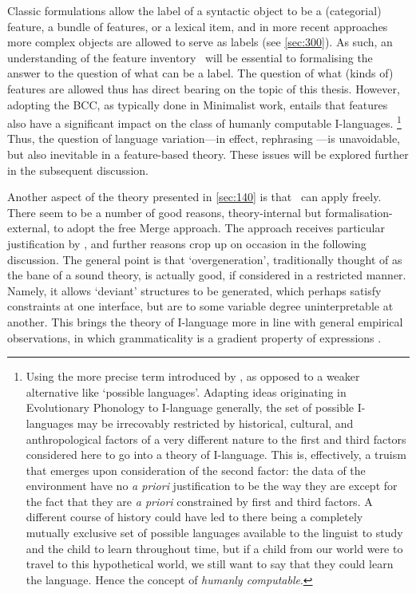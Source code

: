Classic formulations allow the label of a syntactic object to be a (categorial) feature, a bundle of features, or a lexical item, and in more recent approaches more complex objects are allowed to serve as labels (see \autoref{sec:300}). As such, an understanding of the feature inventory \setF\ will be essential to formalising the answer to the question of what can be a label. The question of what (kinds of) features are allowed thus has direct bearing on the topic of this thesis. However, adopting the BCC, as typically done in Minimalist work, entails that features also have a significant impact on the class of humanly computable I-languages.%
\footnote{Using the more precise term introduced by \textcite[3]{HaleM.ReissC_2008}, as opposed to a weaker alternative like `possible languages'. Adapting ideas originating in Evolutionary Phonology \parencite{BlevinsJ_2004} to I-language generally, the set of possible I-languages may be irrecovably restricted by historical, cultural, and anthropological factors of a very different nature to the first and third factors considered here to go into a theory of I-language. This is, effectively, a truism that emerges upon consideration of the second factor: the data of the environment have no \textit{a priori} justification to be the way they are except for the fact that they are \textit{a priori} constrained by first and third factors. A different course of history could have led to there being a completely mutually exclusive set of possible languages available to the linguist to study and the child to learn throughout time, but if a child from our world were to travel to this hypothetical world, we still want to say that they could learn the language. Hence the concept of \textit{humanly computable}.}
Thus, the question of language variation---in effect, rephrasing ---is unavoidable, but also inevitable in a feature-based theory. These issues will be explored further in the subsequent discussion.

Another aspect of the theory presented in \autoref{sec:140} is that \MERGE\ can apply freely. There seem to be a number of good reasons, theory-internal but formalisation-external, to adopt the free Merge approach. The approach receives particular justification by \textcite{ChomskyN.etal_2019}, and further reasons crop up on occasion in the following discussion. The general point is that `overgeneration', traditionally thought of as the bane of a sound theory, is actually good, if considered in a restricted manner. Namely, it allows `deviant' structures to be generated, which perhaps satisfy constraints at one interface, but are to some variable degree uninterpretable at another. This brings the theory of I-language more in line with general empirical observations, in which grammaticality is a gradient property of expressions \parencite{SprouseJ.etal_2018}.

